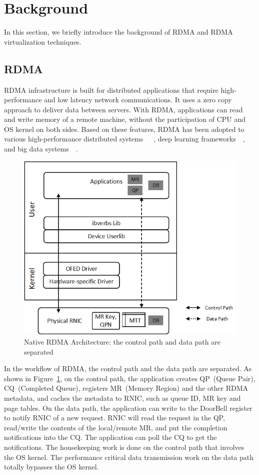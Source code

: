 \section{Background} \label{background}
In this section, we briefly introduce the background of RDMA and RDMA virtualization techniques.

\subsection{RDMA}
RDMA infrastructure is built for distributed applications that require high-performance and low latency network communications.
It uses a zero copy approach to deliver data between servers. With RDMA, applications can read and write memory of a remote machine, without the participation of CPU and OS kernel on both sides. Based on these features, RDMA has been adopted to various high-performance distributed systems~\cite{dragojevic2014farm}~\cite{wei2015fast}~\cite{lu2017octopus}, deep learning frameworks~\cite{abadi2016tensorflow}~\cite{chen2015mxnet}, and big data systems~\cite{spark-rdma}~\cite{hadoop-rdma}.

\begin{figure}[!ht]
	\centering
	\includegraphics[width=0.8\linewidth]{images/rdma-feat.png}
	\caption{Native RDMA Architecture: the control path and data path are separated}
	\label{fig:rdma-feat}
\end{figure}

In the workflow of RDMA, the control path and the data path are separated. As shown in Figure~\ref{fig:rdma-feat}, on the control path, the application creates QP~(Queue Pair), CQ~(Completed Queue), registers MR~(Memory Region) and the other RDMA metadata, and caches the metadata to RNIC, such as queue ID, MR key and page tables. On the data path, the application can write to the DoorBell register to notify RNIC of a new request. RNIC will read the request in the QP, read/write the contents of the local/remote MR, and put the completion notifications into the CQ. The application can poll the CQ to get the notifications. The housekeeping work is done on the control path that involves the OS kernel. The performance critical data transmission work on the data path totally bypasses the OS kernel.

